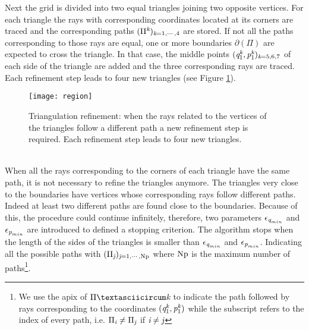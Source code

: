 Next the grid is divided into two equal triangles joining two opposite vertices. For each triangle the rays with corresponding coordinates located at its corners are traced and the corresponding paths $(\Pi^{\textit{k}})_{\textit{k}=1, \cdots, 4}$ are stored.
If not all the paths corresponding to
those rays are equal, one or more boundaries
$\partial$$(\Pi)$ are expected to cross the triangle.
In that case, the middle points $(\textit{q}_1^{\textit{k}},\textit{p}_1^{\textit{k}})_{\textit{k}=5,6,7}$ of each side of the triangle are added and
the three corresponding rays are traced. Each refinement step leads to four new triangles (see Figure \ref{fig:refinement}).
 \begin{figure}[h]
  \begin{center}
  \texttt{[image: region]}
  \end{center}
  \caption{Triangulation refinement:
  when the rays related to the vertices of the triangles follow a different path a new refinement step is required.
   Each refinement step leads to four new triangles.}
  \label{fig:refinement}
\end{figure}
  \\ \indent
When all the rays corresponding to the corners of each triangle have the same path, it is not necessary to refine the triangles anymore.
The triangles very close to the boundaries have vertices whose corresponding rays follow different paths.
Indeed at least two different paths are found close to the boundaries. Because of this, the procedure could continue infinitely, therefore, two parameters $\epsilon_{\textit{q}_{min}}$ and $\epsilon_{\textit{p}_{min}}$ are introduced to defined a stopping criterion.
The algorithm stops when the length of the sides of the triangles is smaller than $\epsilon_{\textit{q}_{min}}$ and $\epsilon_{\textit{p}_{min}}$.
Indicating all the possible paths with $(\Pi_{\textit{j}})_{\textit{j}=1, \cdots, \textrm{Np}}$ where $\textrm{Np}$ is the maximum number of paths\footnote{We use the apix  of $\Piˆ{\variabile{k}}$ to indicate the path followed by rays corresponding to the coordinates $(\textit{q}_1^{\textit{k}},\textit{p}_1^{\textit{k}})$ while the subscript refers to the index of every path, i.e. $\Pi_{\textit{i}}\neq\Pi_{\textit{j}}$ if $\textit{i}\neq\textit{j}$}.
